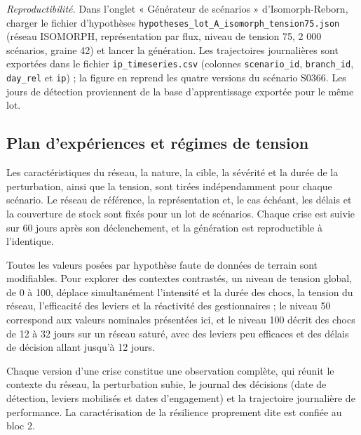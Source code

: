\textit{Reproductibilité.} Dans l'onglet « Générateur de scénarios » d'Isomorph-Reborn, charger le fichier d'hypothèses \texttt{hypotheses\_lot\_A\_isomorph\_tension75.json} (réseau ISOMORPH, représentation par flux, niveau de tension 75, 2 000 scénarios, graine 42) et lancer la génération. Les trajectoires journalières sont exportées dans le fichier \texttt{ip\_timeseries.csv} (colonnes \texttt{scenario\_id}, \texttt{branch\_id}, \texttt{day\_rel} et \texttt{ip}) ; la figure en reprend les quatre versions du scénario S0366. Les jours de détection proviennent de la base d'apprentissage exportée pour le même lot.

\subsection{Plan d'expériences et régimes de tension}
\label{sec:3.7}

Les caractéristiques du réseau, la nature, la cible, la sévérité et la durée de la perturbation, ainsi que la tension, sont tirées indépendamment pour chaque scénario. Le réseau de référence, la représentation et, le cas échéant, les délais et la couverture de stock sont fixés pour un lot de scénarios. Chaque crise est suivie sur 60 jours après son déclenchement, et la génération est reproductible à l'identique.

Toutes les valeurs posées par hypothèse faute de données de terrain sont modifiables. Pour explorer des contextes contrastés, un niveau de tension global, de 0 à 100, déplace simultanément l'intensité et la durée des chocs, la tension du réseau, l'efficacité des leviers et la réactivité des gestionnaires ; le niveau 50 correspond aux valeurs nominales présentées ici, et le niveau 100 décrit des chocs de 12 à 32 jours sur un réseau saturé, avec des leviers peu efficaces et des délais de décision allant jusqu'à 12 jours.

Chaque version d'une crise constitue une observation complète, qui réunit le contexte du réseau, la perturbation subie, le journal des décisions (date de détection, leviers mobilisés et dates d'engagement) et la trajectoire journalière de performance. La caractérisation de la résilience proprement dite est confiée au bloc 2.
